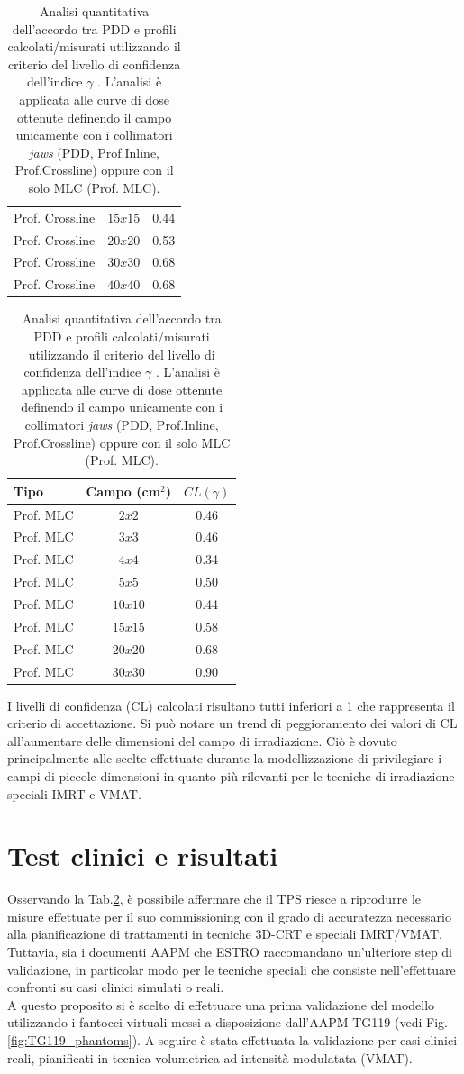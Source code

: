 \begin{table}
\begin{tabular}{lcc}
Prof. Crossline & $15x15$ & 0.44\\
Prof. Crossline & $20x20$ & 0.53\\
Prof. Crossline & $30x30$ & 0.68\\
Prof. Crossline & $40x40$ & 0.68\\
\bottomrule
\end{tabular}
\begin{tabular}{lcc}
\toprule
Tipo & Campo (cm$^2$) & $CL(\gamma)$\\
\midrule
Prof. MLC & $2x2$ & 0.46\\
Prof. MLC & $3x3$ & 0.46\\
Prof. MLC & $4x4$ & 0.34\\
Prof. MLC & $5x5$ & 0.50\\
Prof. MLC & $10x10$ & 0.44\\
Prof. MLC & $15x15$ & 0.58\\
Prof. MLC & $20x20$ & 0.68\\
Prof. MLC & $30x30$ & 0.90\\
\bottomrule
\end{tabular}
\caption{Analisi quantitativa dell'accordo tra PDD e profili calcolati/misurati utilizzando il criterio del livello di confidenza dell'indice $\gamma$ \cite{Mijnheer2004,Ezzell2009}. L'analisi è applicata alle curve di dose ottenute definendo il campo unicamente con i collimatori \textit{jaws} (PDD, Prof.Inline, Prof.Crossline) oppure con il solo MLC (Prof. MLC).}
\label{tab:Ray_ALL_meas_calc}
\end{table}

I livelli di confidenza (CL) calcolati risultano tutti inferiori a 1 che rappresenta il criterio di accettazione. Si può notare un trend di peggioramento dei valori di CL all'aumentare delle dimensioni del campo di irradiazione. Ciò è dovuto principalmente alle scelte effettuate durante la modellizzazione di privilegiare i campi di piccole dimensioni in quanto più rilevanti per le tecniche di irradiazione speciali IMRT e VMAT.





\section{Test clinici e risultati}
Osservando la Tab.\ref{tab:Ray_ALL_meas_calc}, è possibile affermare che il TPS riesce a riprodurre le misure effettuate per il suo commissioning con il grado di accuratezza necessario alla pianificazione di trattamenti in tecniche 3D-CRT e speciali IMRT/VMAT. Tuttavia,  sia i documenti AAPM \cite{Ezzell2009} che ESTRO \cite{Mijnheer2005} raccomandano un'ulteriore step di validazione, in particolar modo per le tecniche speciali che consiste nell'effettuare confronti su casi clinici simulati o reali.\\
A questo proposito si è scelto di effettuare una prima validazione del modello utilizzando i fantocci virtuali messi a disposizione dall'AAPM TG119 \cite{Ezzell2009} (vedi Fig.\ref{fig:TG119_phantoms}). A seguire è stata effettuata la validazione per casi clinici reali, pianificati in tecnica volumetrica ad intensità modulatata (VMAT).

